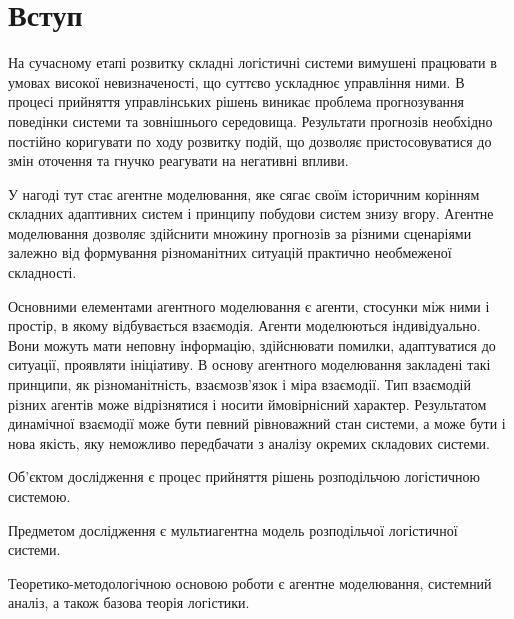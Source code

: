 \section*{Вступ}


На сучасному етапі розвитку складні логістичні системи вимушені працювати в умовах високої невизначеності, що суттєво ускладнює управління ними. 
В процесі прийняття управлінських рішень виникає проблема прогнозування поведінки системи та зовнішнього середовища. 
Результати прогнозів необхідно постійно коригувати по ходу розвитку подій, що дозволяє пристосовуватися до змін оточення та гнучко реагувати на негативні впливи. 

У нагоді тут стає агентне моделювання, яке сягає своїм історичним корінням складних адаптивних систем і принципу побудови систем знизу вгору.
Агентне моделювання дозволяє здійснити множину прогнозів за різними сценаріями залежно від формування різноманітних ситуацій практично необмеженої складності. 

Основними елементами агентного моделювання є агенти, стосунки між ними і простір, в якому відбувається взаємодія. 
Агенти моделюються індивідуально. 
Вони можуть мати неповну інформацію, здійснювати помилки, адаптуватися до ситуації, проявляти ініціативу. 
В основу агентного моделювання закладені такі принципи, як різноманітність, взаємозв’язок і міра взаємодії. 
Тип взаємодій різних агентів може відрізнятися і носити ймовірнісний характер. 
Результатом динамічної взаємодії може бути певний рівноважний стан системи, а може бути і нова якість, яку неможливо передбачати з аналізу окремих складових системи.

Об'єктом дослідження є процес прийняття рішень розподільчою логістичною системою. 

Предметом дослідження є мультиагентна модель розподільчої логістичної системи. 

Теоретико-методологічною основою роботи є агентне моделювання, системний аналіз, а також базова теорія логістики.

